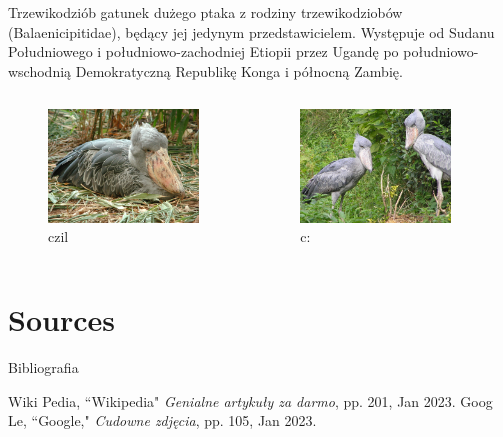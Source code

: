 \documentclass{beamer}
\begin{document}
\begin{frame}{Trzewikodziób}
 gatunek dużego ptaka z rodziny trzewikodziobów (Balaenicipitidae), będący jej jedynym przedstawicielem. Występuje od Sudanu Południowego i południowo-zachodniej Etiopii przez Ugandę po południowo-wschodnią Demokratyczną Republikę Konga i północną Zambię.
	\begin{columns}
		\begin{figure}
			\hspace*{-3cm}
			\includegraphics[width=4cm]{czilera.jpg}
			\caption{czil}
		\end{figure}
		
		\begin{figure}
			\caption{c:}
			\hspace*{-2cm}
			\includegraphics[width=4cm]{kolezanka.jpg}
			
		\end{figure}
	\end{columns}
\end{frame}

\section{Sources}
\begin{frame}{Bibliografia}
\begin{thebibliography}{10}
	Wiki Pedia, ``Wikipedia" \emph{Genialne artykuły za darmo}, pp. 201, Jan 2023.
	Goog Le, ``Google," \emph{Cudowne zdjęcia}, pp. 105, Jan 2023.
\end{thebibliography}
\end{frame}
\end{document}
